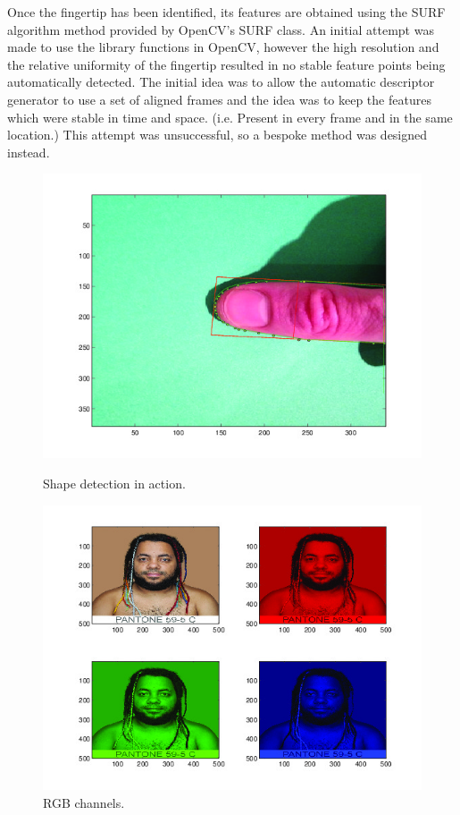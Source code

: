 Once the fingertip has been identified, its features are obtained using the SURF algorithm method provided by OpenCV's SURF class. An initial attempt was made to use the library functions in OpenCV, however the high resolution and the relative uniformity of the fingertip resulted in no stable feature points being automatically detected. The initial idea was to allow the automatic descriptor generator to use a set of aligned frames and the idea was to keep the features which were stable in time and space. (i.e. Present in every frame and in the same location.) This attempt was unsuccessful, so a bespoke method was designed instead.

\begin{figure}[h!]
  \centering
    \includegraphics[width=\textwidth]{Chapter4/Figs/shapeDetection.jpg}\label{fig:shapeDetection}
    \caption{Shape detection in action.}
\end{figure}

\begin{figure}[h!]
  \centering
    \includegraphics[width=\textwidth]{Chapter4/Figs/rainbowmanRGB.jpg}
    \caption{RGB channels.}
\end{figure}

